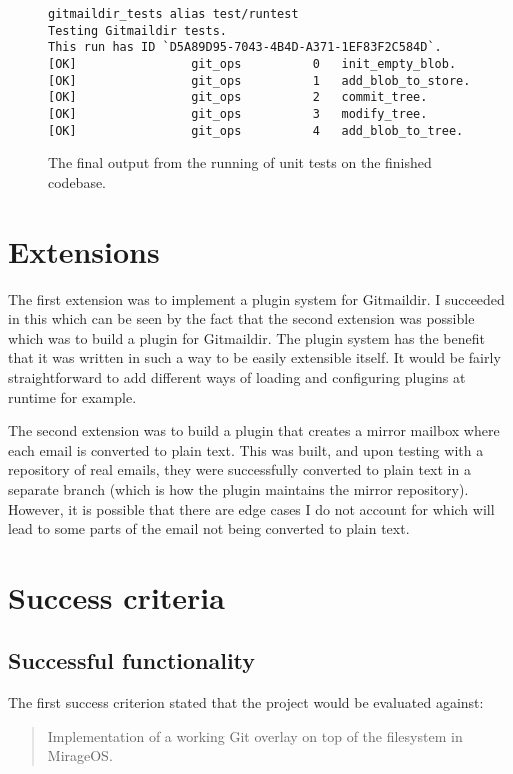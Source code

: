 \begin{figure}[h]
\centering
\begin{Verbatim}
gitmaildir_tests alias test/runtest
Testing Gitmaildir tests.
This run has ID `D5A89D95-7043-4B4D-A371-1EF83F2C584D`.
[OK]                git_ops          0   init_empty_blob.
[OK]                git_ops          1   add_blob_to_store.
[OK]                git_ops          2   commit_tree.
[OK]                git_ops          3   modify_tree.
[OK]                git_ops          4   add_blob_to_tree.
\end{Verbatim}
\caption{The final output from the running of unit tests on the finished codebase.}
\label{fig:unittests}
\end{figure}

\section{Extensions}

The first extension was to implement a plugin system for Gitmaildir. I succeeded in this which can be seen by the fact that the second extension was possible which was to build a plugin for Gitmaildir. The plugin system has the benefit that it was written in such a way to be easily extensible itself. It would be fairly straightforward to add different ways of loading and configuring plugins at runtime for example.

The second extension was to build a plugin that creates a mirror mailbox where each email is converted to plain text. This was built, and upon testing with a repository of real emails, they were successfully converted to plain text in a separate branch (which is how the plugin maintains the mirror repository). However, it is possible that there are edge cases I do not account for which will lead to some parts of the email not being converted to plain text.

\section{Success criteria}

\subsection{Successful functionality}

The first success criterion stated that the project would be evaluated against:

\begin{quote}
  Implementation of a working Git overlay on top of the filesystem in \mbox{MirageOS}.
\end{quote}

